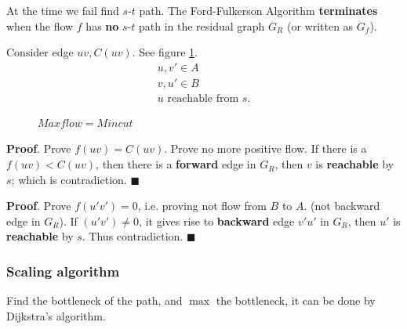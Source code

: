 \documentclass[a4paper]{report}
\theoremstyle{definition}
\begin{document}
At the time we fail find $s$-$t$ path. The Ford-Fulkerson Algorithm \textbf{terminates} when the flow $f$ has \textbf{no} $s$-$t$ path in the residual graph $G_R$ (or written as $G_f$). 

Consider edge $uv, C(uv)$. See figure \ref{fig:7_5}. 
\begin{align*}
u,v' \in A\\
v,u' \in B \\ 
u \text{ reachable from } s. 
\end{align*}
\begin{figure}[!htp]
\centering
{}
\caption{$Maxflow = Mincut$}
\label{fig:7_5}
\end{figure}

\textbf{Proof}. Prove $f(uv)=C(uv)$. Prove no more positive flow. If there is a $f(uv)< C(uv)$, then there is a \textbf{forward} edge in $G_R$, then $v$ is \textbf{reachable} by $s$; which is contradiction. $\blacksquare$

\textbf{Proof}. Prove $f(u'v')=0$, i.e. proving not flow from $B$ to $A$. (not backward edge in $G_R$). If $(u'v')\neq 0$, it gives rise to \textbf{backward} edge $v'u'$ in $G_R$, then $u'$ is \textbf{reachable} by $s$. Thus contradiction. $\blacksquare$
\subsubsection{Scaling algorithm}
Find the bottleneck of the path, and $\max$ the bottleneck, it can be done by Dijkstra's algorithm. 
\end{document}
